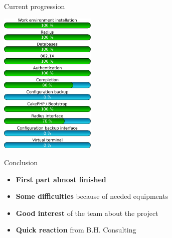 \documentclass[12pt]{beamer}
\begin{document}
\begin{frame}{Current progression}
    \begin{center}
         \includegraphics[width=130pt]{img/progress.pdf}
    \end{center}
\end{frame}

\begin{frame}{Conclusion}
    \begin{itemize}
	\item \textbf{First part almost finished}
	\vfill
	\item \textbf{Some difficulties} because of needed equipments
	\vfill
	\item \textbf{Good interest} of the team about the project
	\vfill
	\item \textbf{Quick reaction} from B.H. Consulting
    \end{itemize}
\end{frame}
\end{document}
